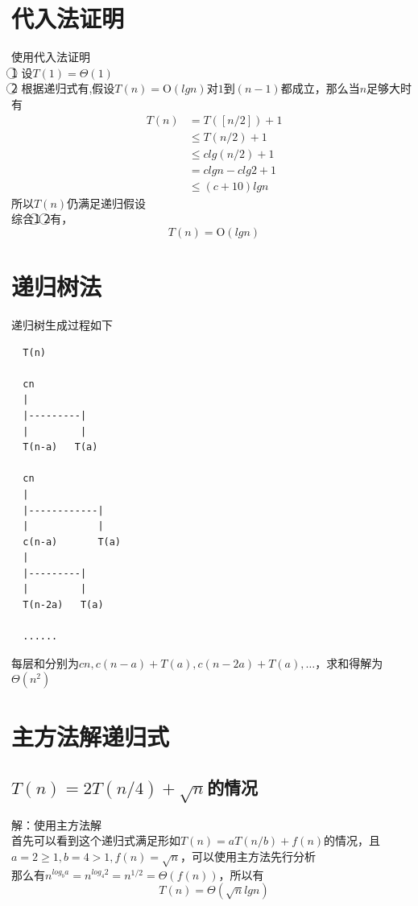 \documentclass[cn,11pt,chinese]{elegantbook}
\begin{document}
\section{代入法证明}

  使用代入法证明\\
  \textcircled{1} 设$T(1) = \Theta (1)$\\
  \textcircled{2} 根据递归式有,假设$T(n) = \mathrm{O}(lgn)$对$1$到$(n-1)$都成立，那么当$n$足够大时有
  \begin{equation}
    \begin{aligned}
        T(n) &= T([n/2]) + 1 \\
              &\le T(n/2) + 1 \\
              &\le clg(n/2) + 1 \\
              &= clgn -clg2 +1 \\
              &\le (c+10)lgn
    \end{aligned}
  \end{equation}
  所以$T(n)$仍满足递归假设\\
  综合\textcircled{1} \textcircled{2}有，
  $$T(n) = \mathrm{O} (lgn)$$

\section{递归树法}

递归树生成过程如下
\begin{lstlisting}
  T(n)

  cn
  |
  |---------|
  |         |
  T(n-a)   T(a)
  
  cn
  |
  |------------|
  |            |
  c(n-a)       T(a)
  |
  |---------|
  |         |
  T(n-2a)   T(a)
  
  ......  
\end{lstlisting}
每层和分别为$cn,c(n-a)+T(a),c(n-2a)+T(a),\dots$，求和得解为$\Theta (n^2)$

\section{主方法解递归式}

\subsection{$T(n) = 2T(n/4)+\sqrt{n}$的情况}
  解：使用主方法解\\
  首先可以看到这个递归式满足形如$T(n) = aT(n/b) + f(n)$的情况，且$a=2 \ge 1,b=4 > 1,f(n) = \sqrt{n}$，可以使用主方法先行分析\\
  那么有$n^{log_b a} = n^{log_4 2} = n^{1/2} = \Theta (f(n))$，所以有
  $$T(n) = \Theta (\sqrt{n}lgn)$$
\end{document}
